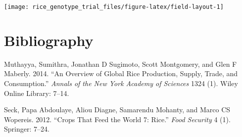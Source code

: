 \documentclass[12pt,]{article}
\begin{document}
\texttt{[image: rice\_genotype\_trial\_files/figure-latex/field-layout-1]}

\hypertarget{bibliography}{%
\section*{Bibliography}\label{bibliography}}

\hypertarget{refs}{}
\leavevmode\hypertarget{ref-muthayya2014overview}{}%
Muthayya, Sumithra, Jonathan D Sugimoto, Scott Montgomery, and Glen F Maberly. 2014. ``An Overview of Global Rice Production, Supply, Trade, and Consumption.'' \emph{Annals of the New York Academy of Sciences} 1324 (1). Wiley Online Library: 7--14.

\leavevmode\hypertarget{ref-seck2012crops}{}%
Seck, Papa Abdoulaye, Aliou Diagne, Samarendu Mohanty, and Marco CS Wopereis. 2012. ``Crops That Feed the World 7: Rice.'' \emph{Food Security} 4 (1). Springer: 7--24.
\end{document}
